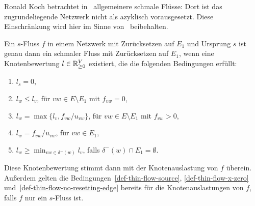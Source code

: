 \begin{remark}
	Ronald Koch betrachtet in~\cite{Koch2012} allgemeinere schmale Flüsse: Dort ist das zugrundeliegende Netzwerk nicht als azyklisch vorausgesetzt.
	Diese Einschränkung wird hier im Sinne von~\cite{Cominetti2015} beibehalten.
\end{remark}

\begin{lemma}\label{lemma-thin-flow-t-def}
	Ein $s$-Fluss $f$ in einem Netzwerk mit Zurücksetzen auf $E_1$ und Ursprung $s$ ist genau dann ein schmaler Fluss mit Zurücksetzen auf $E_1$, wenn eine Knotenbewertung $l\in\mathbb{R}_{\geq 0}^V$ existiert, die die folgenden Bedingungen erfüllt:
	\begin{enumerate}[label=(T\arabic*)]
		\item\label{def-thin-flow-source} $l_s = 0$,
		\item\label{def-thin-flow-x-zero} $l_w \leq l_v$, \tabto{4.5cm} für $vw\in E \setminus E_1$ mit $f_{vw}=0$,
		\item\label{def-thin-flow-x-positive} $l_w = \max\{ l_v, f_{vw} / u_{vw} \}$,  \tabto{4.5cm} für $vw\in E\setminus E_1$ mit $f_{vw} > 0$,
		\item\label{def-thin-flow-resetting-edge} $l_w = f_{vw} / u_{vw}$,  \tabto{4.5cm} für $vw\in E_1$,
		\item\label{def-thin-flow-no-resetting-edge} $l_w \geq \min_{vw\in \delta^-(w)} l_v$, \tabto{4.5cm} falls $\delta^-(w)\cap E_1 = \emptyset$.
	\end{enumerate}
	Diese Knotenbewertung stimmt dann mit der Knotenauslastung von $f$ überein.
	Außerdem gelten die Bedingungen~\ref{def-thin-flow-source}, \ref{def-thin-flow-x-zero} und~\ref{def-thin-flow-no-resetting-edge} bereits für die Knotenauslastungen von $f$, falls $f$ nur ein $s$-Fluss ist.
\end{lemma}
